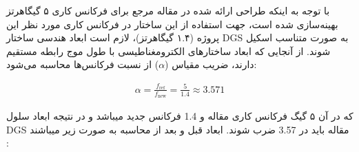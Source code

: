  
 با توجه به اینکه طراحی ارائه شده در مقاله مرجع
 \cite{carver1981microstrip}
 برای فرکانس کاری ۵ گیگاهرتز بهینه‌سازی شده است، جهت استفاده از این ساختار در فرکانس کاری مورد نظر این پروژه (۱.۴ گیگاهرتز)، لازم است ابعاد هندسی ساختار DGS به صورت متناسب اسکیل شوند. از آنجایی که ابعاد ساختارهای الکترومغناطیسی با طول موج رابطه مستقیم دارند، ضریب مقیاس ($\alpha$) از نسبت فرکانس‌ها محاسبه می‌شود: 
 
  \begin{align}
 	\label{eq:eq13}
 	\alpha = \frac{f_{\text{ref}}}{f_{\text{new}}} = \frac{5}{1.4} \approx 3.571
 \end{align}
 
 که در آن ۵ گیگ فرکانس کاری مقاله و 1.4 فرکانس جدید میباشد و در نتیجه ابعاد سلول DGS مقاله باید در 3.57 ضرب شوند.
 ابعاد قبل و بعد از محاسبه به صورت زیر میباشند : 
 
 